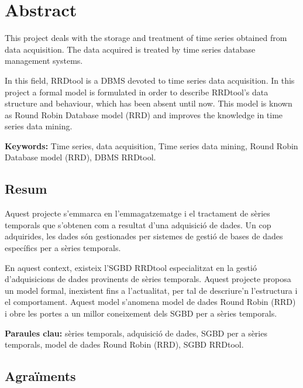 \chapter*{Abstract}

This project deals with the storage and treatment of time series obtained from data acquisition. The data acquired is treated by time series database management systems.

In this field, RRDtool is a DBMS devoted to time series data acquisition. In this project a formal model is formulated in order to describe RRDtool's data structure and behaviour, which has been absent until now. This model is known as Round Robin Database model (RRD) and improves the knowledge in time series data mining.


{\bfseries  Keywords:} Time series, data acquisition, Time series data mining, Round Robin Database model (RRD), DBMS  RRDtool. 



\section*{Resum}

Aquest projecte s'emmarca en l'emmagatzematge i el tractament de
sèries temporals que s'obtenen com a resultat d'una adquisició de
dades. Un cop adquirides, les dades són gestionades per sistemes de
gestió de bases de dades específics per a sèries temporals.

En aquest context, existeix l'SGBD RRDtool especialitzat en la gestió
d'adquisicions de dades provinents de sèries temporals. Aquest
projecte proposa un model formal, inexistent fins a l'actualitat, per
tal de descriure'n l'estructura i el comportament. Aquest model
s'anomena model de dades Round Robin (RRD) i obre les portes a
un millor coneixement dels SGBD per a sèries temporals.




{\bfseries Paraules clau:} sèries temporals, adquisició de dades, SGBD per a sèries temporals, model de dades Round Robin (RRD), SGBD RRDtool.














\newpage


\section*{Agraïments}


